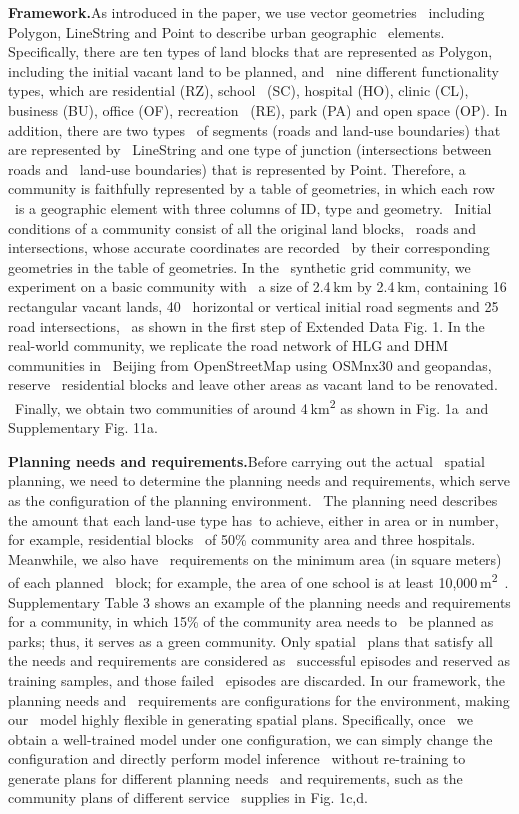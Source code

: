 \textbf{Framework.}As introduced in the paper, we use vector geometries \
including Polygon, LineString and Point to describe urban geographic \
elements. Specifically, there are ten types of land blocks that are represented as Polygon, including the initial vacant land to be planned, and \
nine different functionality types, which are residential (RZ), school \
(SC), hospital (HO), clinic (CL), business (BU), office (OF), recreation \
(RE), park (PA) and open space (OP). In addition, there are two types \
of segments (roads and land-use boundaries) that are represented by \
LineString and one type of junction (intersections between roads and \
land-use boundaries) that is represented by Point. Therefore, a community is faithfully represented by a table of geometries, in which each row \
is a geographic element with three columns of ID, type and geometry. \
Initial conditions of a community consist of all the original land blocks, \
roads and intersections, whose accurate coordinates are recorded \
by their corresponding geometries in the table of geometries. In the \
synthetic grid community, we experiment on a basic community with \
a size of 2.4 km by 2.4 km, containing 16 rectangular vacant lands, 40 \
horizontal or vertical initial road segments and 25 road intersections, \
as shown in the first step of Extended Data Fig. 1. In the real-world community, we replicate the road network of HLG and DHM communities in \
Beijing from OpenStreetMap using OSMnx30 and geopandas, reserve \
residential blocks and leave other areas as vacant land to be renovated. \
Finally, we obtain two communities of around 4 km\textsuperscript{2} as shown in Fig. 1a\
and Supplementary Fig. 11a.

\textbf{Planning needs and requirements.}Before carrying out the actual \
spatial planning, we need to determine the planning needs and requirements, which serve as the configuration of the planning environment. \
The planning need describes the amount that each land-use type has\
to achieve, either in area or in number, for example, residential blocks \
of 50\% community area and three hospitals. Meanwhile, we also have \
requirements on the minimum area (in square meters) of each planned \
block; for example, the area of one school is at least 10,000 m\textsuperscript{2}\
. Supplementary Table 3 shows an example of the planning needs and requirements for a community, in which 15\% of the community area needs to \
be planned as parks; thus, it serves as a green community. Only spatial \
plans that satisfy all the needs and requirements are considered as \
successful episodes and reserved as training samples, and those failed \
episodes are discarded. In our framework, the planning needs and \
requirements are configurations for the environment, making our \
model highly flexible in generating spatial plans. Specifically, once \
we obtain a well-trained model under one configuration, we can simply change the configuration and directly perform model inference \
without re-training to generate plans for different planning needs \
and requirements, such as the community plans of different service \
supplies in Fig. 1c,d.

